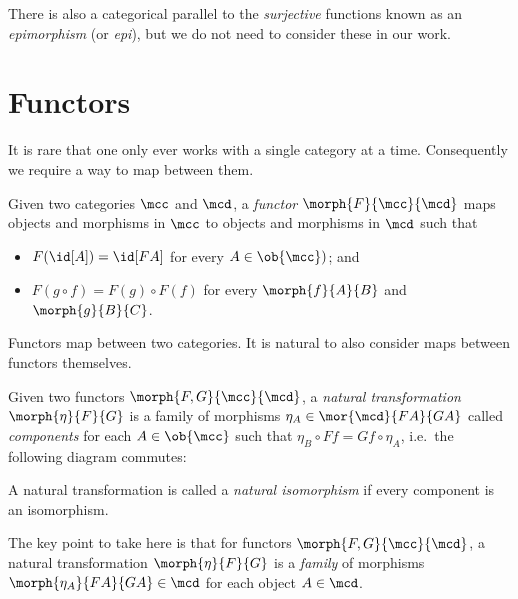 \begin{remark}
    There is also a categorical parallel to the \emph{surjective} functions
    known as an \emph{epimorphism} (or \emph{epi}), but we do not need to
    consider these in our work.
\end{remark}

\section{Functors}

It is rare that one only ever works with a single category at a time.
Consequently we require a way to map between them.

\begin{definition}[Functor]
    Given two categories \(\mcc\) and \(\mcd\), a \emph{functor} \(
        \morph{F}{\mcc}{\mcd}
    \) maps objects and morphisms in \(\mcc\) to objects and morphisms in
    \(\mcd\) such that
    \begin{itemize}
        \item \(F(\id[A]) = \id[FA]\) for every \(A \in \ob{\mcc})\); and
        \item \(F(g \circ f) = F(g) \circ F(f)\) for every \(\morph{f}{A}{B}\)
        and \(\morph{g}{B}{C}\).
    \end{itemize}
\end{definition}

Functors map between two categories.
It is natural to also consider maps between functors themselves.

\begin{definition}
    Given two functors \(\morph{F, G}{\mcc}{\mcd}\), a
    \emph{natural transformation} \(\morph{\eta}{F}{G}\) is a family of
    morphisms \(
        \eta_A \in \mor{\mcd}{FA}{GA}
    \) called \emph{components} for each \(A \in \ob{\mcc}\) such that \(
        \eta_B \circ Ff = Gf \circ \eta_A
    \), i.e.\ the following diagram commutes:
    \begin{center}
        
    \end{center}
    A natural transformation is called a \emph{natural isomorphism} if
    every component is an isomorphism.
\end{definition}

The key point to take here is that for functors \(\morph{F,G}{\mcc}{\mcd}\), a
natural transformation \(\morph{\eta}{F}{G}\) is a \emph{family} of morphisms
\(\morph{\eta_A}{FA}{GA} \in \mcd\) for each object \(A \in \mcd\).

